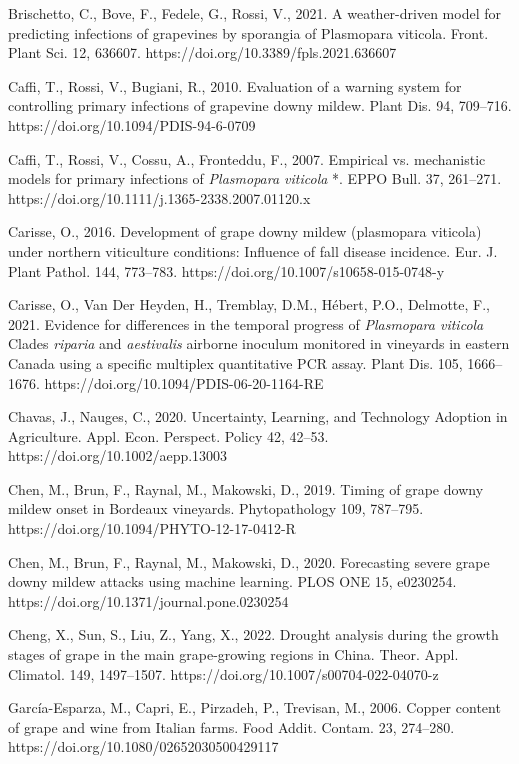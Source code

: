 \documentclass[
]{article}
\begin{document}
Brischetto, C., Bove, F., Fedele, G., Rossi, V., 2021. A weather-driven
model for predicting infections of grapevines by sporangia of Plasmopara
viticola. Front. Plant Sci. 12, 636607.
https://doi.org/10.3389/fpls.2021.636607

Caffi, T., Rossi, V., Bugiani, R., 2010. Evaluation of a warning system
for controlling primary infections of grapevine downy mildew. Plant Dis.
94, 709--716. https://doi.org/10.1094/PDIS-94-6-0709

Caffi, T., Rossi, V., Cossu, A., Fronteddu, F., 2007. Empirical vs.
mechanistic models for primary infections of \emph{Plasmopara viticola}
*. EPPO Bull. 37, 261--271.
https://doi.org/10.1111/j.1365-2338.2007.01120.x

Carisse, O., 2016. Development of grape downy mildew (plasmopara
viticola) under northern viticulture conditions: Influence of fall
disease incidence. Eur. J. Plant Pathol. 144, 773--783.
https://doi.org/10.1007/s10658-015-0748-y

Carisse, O., Van Der Heyden, H., Tremblay, D.M., Hébert, P.O., Delmotte,
F., 2021. Evidence for differences in the temporal progress of
\emph{Plasmopara viticola} Clades \emph{riparia} and \emph{aestivalis}
airborne inoculum monitored in vineyards in eastern Canada using a
specific multiplex quantitative PCR assay. Plant Dis. 105, 1666--1676.
https://doi.org/10.1094/PDIS-06-20-1164-RE

Chavas, J., Nauges, C., 2020. Uncertainty, Learning, and Technology
Adoption in Agriculture. Appl. Econ. Perspect. Policy 42, 42--53.
https://doi.org/10.1002/aepp.13003

Chen, M., Brun, F., Raynal, M., Makowski, D., 2019. Timing of grape
downy mildew onset in Bordeaux vineyards. Phytopathology 109, 787--795.
https://doi.org/10.1094/PHYTO-12-17-0412-R

Chen, M., Brun, F., Raynal, M., Makowski, D., 2020. Forecasting severe
grape downy mildew attacks using machine learning. PLOS ONE 15,
e0230254. https://doi.org/10.1371/journal.pone.0230254

Cheng, X., Sun, S., Liu, Z., Yang, X., 2022. Drought analysis during the
growth stages of grape in the main grape-growing regions in China.
Theor. Appl. Climatol. 149, 1497--1507.
https://doi.org/10.1007/s00704-022-04070-z

García-Esparza, M., Capri, E., Pirzadeh, P., Trevisan, M., 2006. Copper
content of grape and wine from Italian farms. Food Addit. Contam. 23,
274--280. https://doi.org/10.1080/02652030500429117
\end{document}
